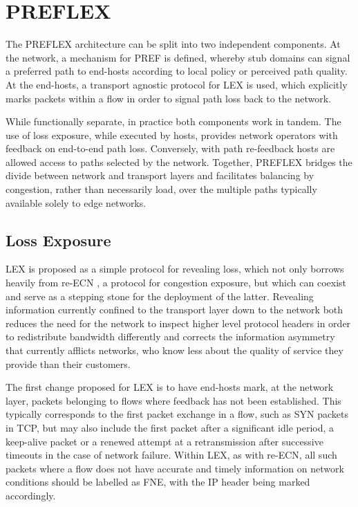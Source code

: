 \section{PREFLEX}

The \ac{PREFLEX} architecture can be split into two independent components. At the network, a mechanism for \ac{PREF} is defined, whereby stub domains can signal a preferred path to end-hosts according to local policy or perceived path quality. At the end-hosts, a transport agnostic protocol for \ac{LEX} is used, which explicitly marks packets within a flow in order to signal path loss back to the network.

While functionally separate, in practice both components work in tandem. The use of loss exposure, while executed by hosts, provides network operators with feedback on end-to-end path loss. Conversely, with path re-feedback hosts are allowed access to paths selected by the network. Together, \ac{PREFLEX} bridges the divide between network and transport layers and facilitates balancing by congestion, rather than necessarily load, over the multiple paths typically available solely to edge networks.

\subsection{Loss Exposure}

\ac{LEX} is proposed as a simple protocol for revealing loss, which not only borrows heavily from re-\ac{ECN} \cite{Briscoe:2008p494}, a protocol for congestion exposure, but which can coexist and serve as a stepping stone for the deployment of the latter. 
Revealing information currently confined to the transport layer down to the network both reduces the need for the network to inspect higher level protocol headers in order to redistribute bandwidth differently and corrects the information asymmetry that currently afflicts networks, who know less about the quality of service they provide than their customers.

The first change proposed for \ac{LEX} is to have end-hosts mark, at the network layer, packets belonging to flows where feedback has not been established. 
This typically corresponds to the first packet exchange in a flow, such as SYN packets in \ac{TCP}, but may also include the first packet after a significant idle period, a keep-alive packet or a renewed attempt at a retransmission after successive timeouts in the case of network failure. 
Within \ac{LEX}, as with re-\ac{ECN}, all such packets where a flow does not have accurate and timely information on network conditions should be labelled as \ac{FNE}, with the \ac{IP} header being marked accordingly.

